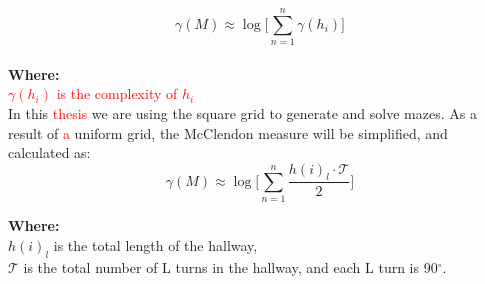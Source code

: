 \begin{equation}
\gamma(M) \approx \log \bigl[\sum_{n =1}^{n}\gamma(h_i)\bigr]
\end{equation}
\\
\textbf{Where:}\\
\textcolor{red}{$\gamma(h_i)$ is the complexity of $h_i$}\\
 \newline
In this \textcolor{red}{thesis} we are using the square grid to generate and solve mazes. As a result of \textcolor{red}{a} uniform grid, the McClendon measure will be simplified, and calculated as:
\begin{equation} 
\gamma(M) \approx \log \bigl[\sum_{n =1}^{n}\frac{h(i)_l\cdot \mathcal{T}}{2}\bigr]
\end{equation}

\textbf{Where:}\\
$h(i)_l$ is the total length of the hallway,\\
$\mathcal{T}$ is the total number of L turns in the hallway, and each L turn is 90$^\circ$.%
